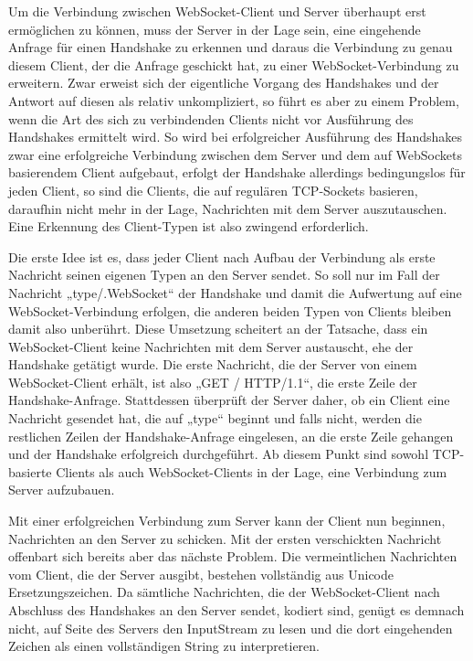 \documentclass[12pt, onecolumn,notitlepage]{scrartcl}
\begin{document}
Um die Verbindung zwischen WebSocket-Client und Server überhaupt erst ermöglichen zu können, muss der Server in der Lage sein, eine eingehende Anfrage für einen Handshake zu erkennen und daraus die Verbindung zu genau diesem Client, der die Anfrage geschickt hat, zu einer WebSocket-Verbindung zu erweitern. Zwar erweist sich der eigentliche Vorgang des Handshakes und der Antwort auf diesen als relativ unkompliziert, so führt es aber zu einem Problem, wenn die Art des sich zu verbindenden Clients nicht vor Ausführung des Handshakes ermittelt wird. So wird bei erfolgreicher Ausführung des Handshakes zwar eine erfolgreiche Verbindung zwischen dem Server und dem auf WebSockets basierendem Client aufgebaut, erfolgt der Handshake allerdings bedingungslos für jeden Client, so sind die Clients, die auf regulären TCP-Sockets basieren, daraufhin nicht mehr in der Lage, Nachrichten mit dem Server auszutauschen. Eine Erkennung des Client-Typen ist also zwingend erforderlich. \par

Die erste Idee ist es, dass jeder Client nach Aufbau der Verbindung als erste Nachricht seinen eigenen Typen an den Server sendet. So soll nur im Fall der Nachricht „type/.WebSocket“ der Handshake und damit die Aufwertung auf eine WebSocket-Verbindung erfolgen, die anderen beiden Typen von Clients bleiben damit also unberührt. Diese Umsetzung scheitert an der Tatsache, dass ein WebSocket-Client keine Nachrichten mit dem Server austauscht, ehe der Handshake getätigt wurde. Die erste Nachricht, die der Server von einem WebSocket-Client erhält, ist also „GET / HTTP/1.1“, die erste Zeile der Handshake-Anfrage. Stattdessen überprüft der Server daher, ob ein Client eine Nachricht gesendet hat, die auf „type“ beginnt und falls nicht, werden die restlichen Zeilen der Handshake-Anfrage eingelesen,  an die erste Zeile gehangen und der Handshake erfolgreich durchgeführt. Ab diesem Punkt sind sowohl TCP-basierte Clients als auch WebSocket-Clients in der Lage, eine Verbindung zum Server aufzubauen. \par

Mit einer erfolgreichen Verbindung zum Server kann der Client nun beginnen, Nachrichten an den Server zu schicken. Mit der ersten verschickten Nachricht offenbart sich bereits aber das nächste Problem. Die vermeintlichen Nachrichten vom Client, die der Server ausgibt, bestehen vollständig aus Unicode Ersetzungszeichen. Da sämtliche Nachrichten, die der WebSocket-Client nach Abschluss des Handshakes an den Server sendet, kodiert sind, genügt es demnach nicht, auf Seite des Servers den InputStream zu lesen und die dort eingehenden Zeichen als einen vollständigen String zu interpretieren. \par
\end{document}
